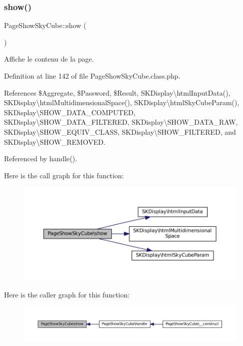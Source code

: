 \subsubsection{\texorpdfstring{show()}{show()}}
{\footnotesize\ttfamily Page\+Show\+Sky\+Cube\+::show (\begin{DoxyParamCaption}{ }\end{DoxyParamCaption})\hspace{0.3cm}{\ttfamily [protected]}}

Affiche le contenu de la page. 

Definition at line 142 of file Page\+Show\+Sky\+Cube.\+class.\+php.



References \$\+Aggregate, \$\+Password, \$\+Result, S\+K\+Display\textbackslash{}html\+Input\+Data(), S\+K\+Display\textbackslash{}html\+Multidimensional\+Space(), S\+K\+Display\textbackslash{}html\+Sky\+Cube\+Param(), S\+K\+Display\textbackslash{}\+S\+H\+O\+W\+\_\+\+D\+A\+T\+A\+\_\+\+C\+O\+M\+P\+U\+T\+ED, S\+K\+Display\textbackslash{}\+S\+H\+O\+W\+\_\+\+D\+A\+T\+A\+\_\+\+F\+I\+L\+T\+E\+R\+ED, S\+K\+Display\textbackslash{}\+S\+H\+O\+W\+\_\+\+D\+A\+T\+A\+\_\+\+R\+AW, S\+K\+Display\textbackslash{}\+S\+H\+O\+W\+\_\+\+E\+Q\+U\+I\+V\+\_\+\+C\+L\+A\+SS, S\+K\+Display\textbackslash{}\+S\+H\+O\+W\+\_\+\+F\+I\+L\+T\+E\+R\+ED, and S\+K\+Display\textbackslash{}\+S\+H\+O\+W\+\_\+\+R\+E\+M\+O\+V\+ED.



Referenced by handle().

Here is the call graph for this function\+:\nopagebreak
\begin{figure}[H]
\begin{center}
\leavevmode
\includegraphics[width=350pt]{class_page_show_sky_cube_aea6c5561569163e3d33d75dea4635a3d_cgraph}
\end{center}
\end{figure}
Here is the caller graph for this function\+:\nopagebreak
\begin{figure}[H]
\begin{center}
\leavevmode
\includegraphics[width=350pt]{class_page_show_sky_cube_aea6c5561569163e3d33d75dea4635a3d_icgraph}
\end{center}
\end{figure}


